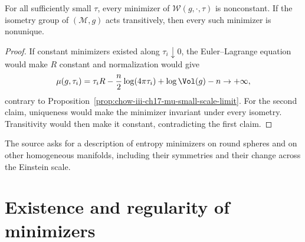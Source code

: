 \begin{lemma}
\label{lem:chow-iii-ch17-small-minimizer-nonconstant-nonunique}
For all sufficiently small $\tau$, every minimizer of
$\mathcal W(g,\cdot,\tau)$ is nonconstant.  If the isometry group of
$(\mathcal M,g)$ acts transitively, then every such minimizer is nonunique.
\end{lemma}
\begin{proof}
\sketch If constant minimizers existed along $\tau_i\downarrow0$, the
Euler--Lagrange equation would make $R$ constant and normalization would give
\[
 \mu(g,\tau_i)=\tau_iR-\frac n2\log(4\pi\tau_i)+\log\Vol(g)-n\to+\infty,
\]
contrary to Proposition~\ref{prop:chow-iii-ch17-mu-small-scale-limit}.
For the second claim, uniqueness would make the minimizer invariant under
every isometry.  Transitivity would then make it constant, contradicting the
first claim.
\end{proof}

\begin{remark}
\label{rem:chow-iii-ch17-homogeneous-minimizer-problem}
The source asks for a description of entropy minimizers on round spheres and
on other homogeneous manifolds, including their symmetries and their change
across the Einstein scale.
\end{remark}

\section{Existence and regularity of minimizers}

